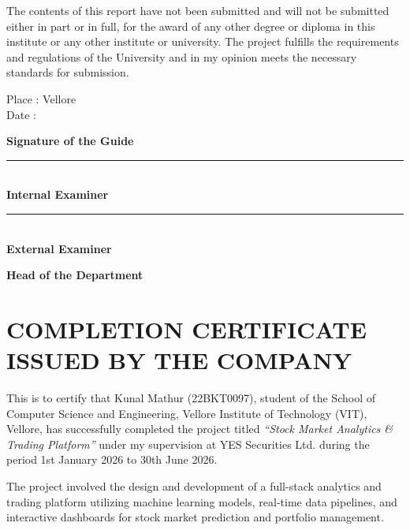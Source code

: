 \documentclass[12pt,a4paper]{report}
\numberwithin{equation}{chapter}
\begin{document}
The contents of this report have not been submitted and will not be submitted either in part or in full, for the award of any other degree or diploma in this institute or any other institute or university. The project fulfills the requirements and regulations of the University and in my opinion meets the necessary standards for submission.

\vspace{0.6cm}
Place : Vellore\\
Date : \\[0.7cm]

\begin{flushright}
\textbf{Signature of the Guide}\\[0.5cm]
\end{flushright}

\vspace{0.2cm}
\noindent
\begin{minipage}[t]{0.48\textwidth}
\centering
\rule{5.3cm}{0.4pt}\\[0.2cm]
\textbf{Internal Examiner}
\end{minipage}
\hfill
\begin{minipage}[t]{0.48\textwidth}
\centering
\rule{5.3cm}{0.4pt}\\[0.2cm]
\textbf{External Examiner}
\end{minipage}

\vspace{0.9cm}

\begin{center}
\textbf{Head of the Department}
\end{center}



\clearpage
\chapter*{COMPLETION CERTIFICATE ISSUED BY THE COMPANY}

This is to certify that Kunal Mathur (22BKT0097), student of the School of Computer Science and Engineering, Vellore Institute of Technology (VIT), Vellore, has successfully completed the project titled \textit{``Stock Market Analytics \& Trading Platform''} under my supervision at YES Securities Ltd. during the period 1st January 2026 to 30th June 2026.

The project involved the design and development of a full-stack analytics and trading platform utilizing machine learning models, real-time data pipelines, and interactive dashboards for stock market prediction and portfolio management.
\end{document}
